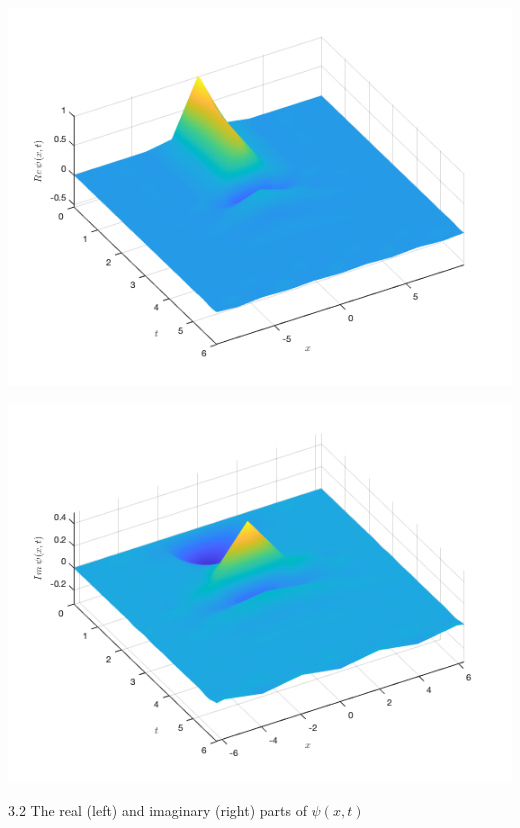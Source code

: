 \documentclass[12pt, letterpaper, twoside]{article}
\begin{document}
\begin{enumerate}[label=(\roman*)]
    \begin{multicols}{2}
        \begin{center}
            \includegraphics[scale=0.35]{with friction/(b-2real).png}
        \end{center} 
        \begin{center}
            \includegraphics[scale=0.35]{with friction/(b-2imag).png}
        \end{center}  
    \end{multicols}
    \figurename{ 3.2 The real (left) and imaginary (right) parts of $\psi(x, t)$}
    

\end{enumerate}
\end{document}
